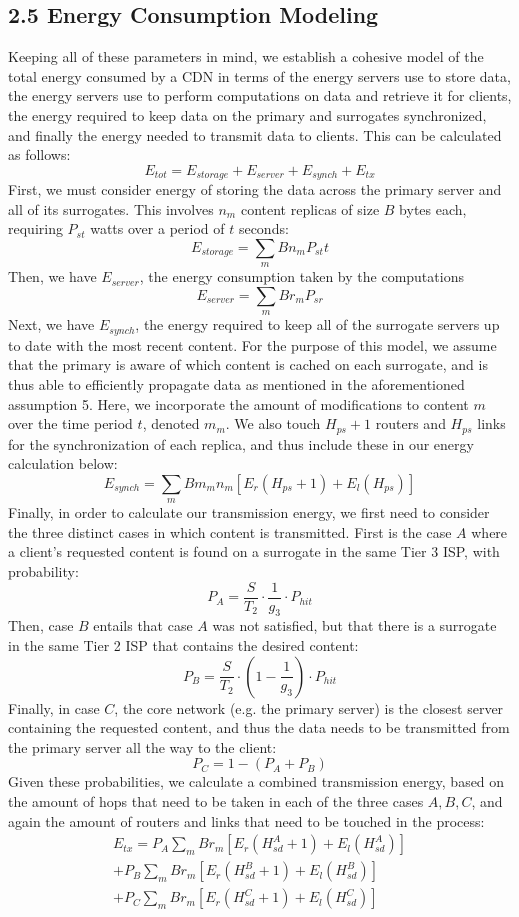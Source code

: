 \documentclass[
	a4paper, %
	10pt, %
	unnumberedsections, %
	twoside, %
]{LTJournalArticle}
\begin{document}
\subsection{2.5  Energy Consumption Modeling}
Keeping all of these parameters in mind, we establish a cohesive model of the total energy consumed by a CDN in terms of the energy servers use to store data, the energy servers use to perform computations on data and retrieve it for clients, the energy required to keep data on the primary and surrogates synchronized, and finally the energy needed to transmit data to clients. This can be calculated as follows:
\[E_{tot} = E_{storage} + E_{server} + E_{synch} + E_{tx}\]
First, we must consider energy of storing the data across the primary server and all of its surrogates. This involves $n_m$ content replicas of size $B$ bytes each, requiring $P_{st}$ watts over a period of $t$ seconds:
\[E_{storage} = \sum_mBn_mP_{st}t\]
Then, we have $E_{server}$, the energy consumption taken by the computations 
\[E_{server} = \sum_mBr_mP_{sr}\]
Next, we have $E_{synch}$, the energy required to keep all of the surrogate servers up to date with the most recent content. For the purpose of this model, we assume that the primary is aware of which content is cached on each surrogate, and is thus able to efficiently propagate data as mentioned in the aforementioned assumption 5. Here, we incorporate the amount of modifications to content $m$ over the time period $t$, denoted $m_m$. We also touch $H_{ps} + 1$ routers and $H_{ps}$ links for the synchronization of each replica, and thus include these in our energy calculation below:
\[E_{synch} = \sum_mBm_mn_m[E_r(H_{ps} + 1) + E_l(H_{ps})]\]
Finally, in order to calculate our transmission energy, we first need to consider the three distinct cases in which content is transmitted. First is the case $A$ where a client's requested content is found on a surrogate in the same Tier 3 ISP, with probability:
\[P_A = \frac{S}{T_2} \cdot \frac{1}{g_3} \cdot P_{hit}\]
Then, case $B$ entails that case $A$ was not satisfied, but that there is a surrogate in the same Tier 2 ISP that contains the desired content:
\[P_B = \frac{S}{T_2} \cdot \left(1 - \frac{1}{g_3}\right) \cdot P_{hit}\]
Finally, in case $C$, the core network (e.g. the primary server) is the closest server containing the requested content, and thus the data needs to be transmitted from the primary server all the way to the client:
\[P_C = 1 - (P_A + P_B)\]
Given these probabilities, we calculate a combined transmission energy, based on the amount of hops that need to be taken in each of the three cases $A, B, C$, and again the amount of routers and links that need to be touched in the process:
\begin{multline*}
    E_{tx} = P_A\sum_mBr_m[E_r(H^A_{sd} + 1) + E_l(H^A_{sd})] \\
      + P_B\sum_mBr_m[E_r(H^B_{sd} + 1) + E_l(H^B_{sd})] \\
      + P_C\sum_mBr_m[E_r(H^C_{sd} + 1) + E_l(H^C_{sd})] \\
\end{multline*}
\end{document}
